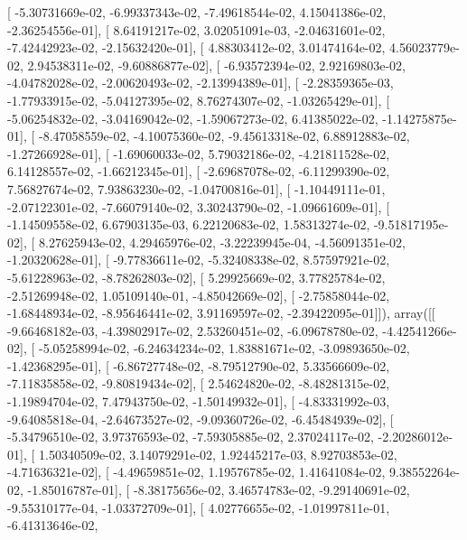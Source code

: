 \documentclass{article}
\begin{document}
       [ -5.30731669e-02,  -6.99337343e-02,  -7.49618544e-02,
          4.15041386e-02,  -2.36254556e-01],
       [  8.64191217e-02,   3.02051091e-03,  -2.04631601e-02,
         -7.42442923e-02,  -2.15632420e-01],
       [  4.88303412e-02,   3.01474164e-02,   4.56023779e-02,
          2.94538311e-02,  -9.60886877e-02],
       [ -6.93572394e-02,   2.92169803e-02,  -4.04782028e-02,
         -2.00620493e-02,  -2.13994389e-01],
       [ -2.28359365e-03,  -1.77933915e-02,  -5.04127395e-02,
          8.76274307e-02,  -1.03265429e-01],
       [ -5.06254832e-02,  -3.04169042e-02,  -1.59067273e-02,
          6.41385022e-02,  -1.14275875e-01],
       [ -8.47058559e-02,  -4.10075360e-02,  -9.45613318e-02,
          6.88912883e-02,  -1.27266928e-01],
       [ -1.69060033e-02,   5.79032186e-02,  -4.21811528e-02,
          6.14128557e-02,  -1.66212345e-01],
       [ -2.69687078e-02,  -6.11299390e-02,   7.56827674e-02,
          7.93863230e-02,  -1.04700816e-01],
       [ -1.10449111e-01,  -2.07122301e-02,  -7.66079140e-02,
          3.30243790e-02,  -1.09661609e-01],
       [ -1.14509558e-02,   6.67903135e-03,   6.22120683e-02,
          1.58313274e-02,  -9.51817195e-02],
       [  8.27625943e-02,   4.29465976e-02,  -3.22239945e-04,
         -4.56091351e-02,  -1.20320628e-01],
       [ -9.77836611e-02,  -5.32408338e-02,   8.57597921e-02,
         -5.61228963e-02,  -8.78262803e-02],
       [  5.29925669e-02,   3.77825784e-02,  -2.51269948e-02,
          1.05109140e-01,  -4.85042669e-02],
       [ -2.75858044e-02,  -1.68448934e-02,  -8.95646441e-02,
          3.91169597e-02,  -2.39422095e-01]]), array([[ -9.66468182e-03,  -4.39802917e-02,   2.53260451e-02,
         -6.09678780e-02,  -4.42541266e-02],
       [ -5.05258994e-02,  -6.24634234e-02,   1.83881671e-02,
         -3.09893650e-02,  -1.42368295e-01],
       [ -6.86727748e-02,  -8.79512790e-02,   5.33566609e-02,
         -7.11835858e-02,  -9.80819434e-02],
       [  2.54624820e-02,  -8.48281315e-02,  -1.19894704e-02,
          7.47943750e-02,  -1.50149932e-01],
       [ -4.83331992e-03,  -9.64085818e-04,  -2.64673527e-02,
         -9.09360726e-02,  -6.45484939e-02],
       [ -5.34796510e-02,   3.97376593e-02,  -7.59305885e-02,
          2.37024117e-02,  -2.20286012e-01],
       [  1.50340509e-02,   3.14079291e-02,   1.92445217e-03,
          8.92703853e-02,  -4.71636321e-02],
       [ -4.49659851e-02,   1.19576785e-02,   1.41641084e-02,
          9.38552264e-02,  -1.85016787e-01],
       [ -8.38175656e-02,   3.46574783e-02,  -9.29140691e-02,
         -9.55310177e-04,  -1.03372709e-01],
       [  4.02776655e-02,  -1.01997811e-01,  -6.41313646e-02,
\end{document}
